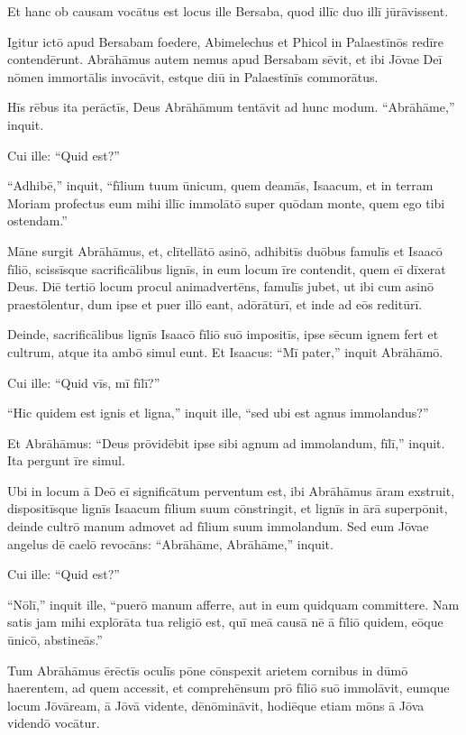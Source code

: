 \Versus Et hanc ob causam vocātus est locus ille Bersaba, quod illīc duo illī jūrāvissent.

\Versus Igitur ictō apud Bersabam foedere, Abimelechus et Phicol in Palaestīnōs redīre contendērunt.
\Versus Abrāhāmus autem nemus apud Bersabam sēvit, et ibi Jōvae Deī nōmen immortālis invocāvit,
\Versus estque diū in Palaestīnīs commorātus.



\Caput
\Versus Hīs rēbus ita perāctīs, Deus Abrāhāmum tentāvit ad hunc modum. ``Abrāhāme,'' inquit.

Cui ille: ``Quid est?''

\Versus ``Adhibē,'' inquit, ``fīlium tuum ūnicum, quem deamās, Isaacum, et in terram Moriam profectus eum mihi illīc immolātō super quōdam monte, quem ego tibi ostendam.''

\Versus Māne surgit Abrāhāmus, et, clītellātō asinō, adhibitīs duōbus famulīs et Isaacō fīliō, scissīsque sacrificālibus lignīs, in eum locum īre contendit, quem eī dīxerat Deus.
\Versus Diē tertiō locum procul animadvertēns,
\Versus famulīs jubet, ut ibi cum asinō praestōlentur, dum ipse et puer illō eant, adōrātūrī, et inde ad eōs reditūrī.

\Versus Deinde, sacrificālibus lignīs Isaacō fīliō suō impositīs, ipse sēcum ignem fert et cultrum, atque ita ambō simul eunt.
\Versus Et Isaacus: ``Mī pater,'' inquit Abrāhāmō.

Cui ille: ``Quid vīs, mī fīlī?''

``Hic quidem est ignis et ligna,'' inquit ille, ``sed ubi est agnus immolandus?''

\Versus Et Abrāhāmus: ``Deus prōvidēbit ipse sibi agnum ad immolandum, fīlī,'' inquit. Ita pergunt īre simul.

\Versus Ubi in locum ā Deō eī significātum perventum est, ibi Abrāhāmus āram exstruit, dispositīsque lignīs Isaacum fīlium suum cōnstringit, et lignīs in ārā superpōnit,
\Versus deinde cultrō manum admovet ad fīlium suum immolandum.
\Versus Sed eum Jōvae angelus dē caelō revocāns: ``Abrāhāme, Abrāhāme,'' inquit.

Cui ille: ``Quid est?''

\Versus ``Nōlī,'' inquit ille, ``puerō manum afferre, aut in eum quidquam committere. Nam satis jam mihi explōrāta tua religiō est, quī meā causā nē ā fīliō quidem, eōque ūnicō, abstineās.''

\Versus Tum Abrāhāmus ērēctīs oculīs pōne cōnspexit arietem cornibus in dūmō haerentem, ad quem accessit, et comprehēnsum prō fīliō suō immolāvit,
\Versus eumque locum Jōvāream, ā Jōvā vidente, dēnōmināvit, hodiēque etiam mōns ā Jōva videndō vocātur.

